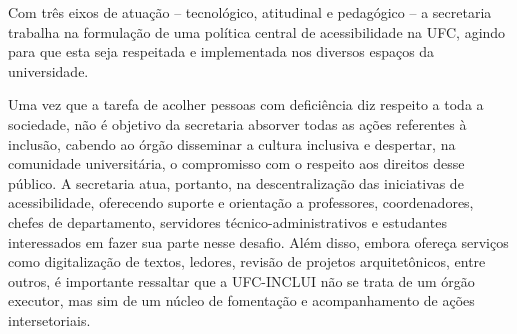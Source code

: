 Com três eixos de atuação – tecnológico, atitudinal e pedagógico – a secretaria trabalha na formulação de uma política central de acessibilidade na UFC, agindo para que esta seja respeitada e implementada nos diversos espaços da universidade.







Uma vez que a tarefa de acolher pessoas com deficiência diz respeito a toda a sociedade, não é objetivo da secretaria absorver todas as ações referentes à inclusão, cabendo ao órgão disseminar a cultura inclusiva e despertar, na comunidade universitária, o compromisso com o respeito aos direitos desse público. A secretaria atua, portanto, na descentralização das iniciativas de acessibilidade, oferecendo suporte e orientação a professores, coordenadores, chefes de departamento, servidores técnico-administrativos e estudantes interessados em fazer sua parte nesse desafio. Além disso, embora ofereça serviços como digitalização de textos, ledores, revisão de projetos arquitetônicos, entre outros, é importante ressaltar que a UFC-INCLUI não se trata de um órgão executor, mas sim de um núcleo de fomentação e acompanhamento de ações intersetoriais.

